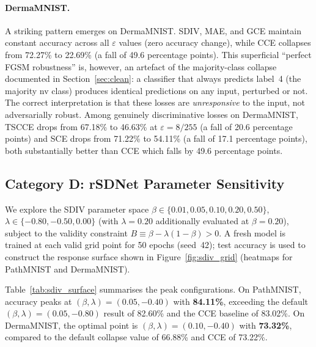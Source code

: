 \paragraph{DermaMNIST.}
A striking pattern emerges on DermaMNIST.
SDIV, MAE, and GCE maintain constant accuracy across all $\varepsilon$ values
(zero accuracy change), while CCE collapses from 72.27\% to 22.69\%
(a fall of 49.6 percentage points).
This superficial ``perfect FGSM robustness'' is, however, an artefact of the
majority-class collapse documented in Section~\ref{sec:clean}:
a classifier that always predicts label~4 (the majority nv class) produces
identical predictions on any input, perturbed or not.
The correct interpretation is that these losses are \emph{unresponsive} to
the input, not adversarially robust.
Among genuinely discriminative losses on DermaMNIST, TSCCE drops from
67.18\% to 46.63\% at $\varepsilon{=}8/255$ (a fall of 20.6 percentage points) and
SCE drops from 71.22\% to 54.11\% (a fall of 17.1 percentage points),
both substantially better than CCE which falls by 49.6 percentage points.

\subsection{Category D: rSDNet Parameter Sensitivity}
\label{sec:surface}

We explore the SDIV parameter space
$\beta \in \{0.01, 0.05, 0.10, 0.20, 0.50\}$,
$\lambda \in \{-0.80, -0.50, 0.00\}$ (with $\lambda{=}0.20$ additionally
evaluated at $\beta{=}0.20$),
subject to the validity constraint $B \equiv \beta - \lambda(1{-}\beta) > 0$.
A fresh model is trained at each valid grid point for 50 epochs (seed~42);
test accuracy is used to construct the response surface shown in
Figure~\ref{fig:sdiv_grid} (heatmaps for PathMNIST and DermaMNIST).

Table~\ref{tab:sdiv_surface} summarises the peak configurations.
On PathMNIST, accuracy peaks at
$(\beta, \lambda) = (0.05, -0.40)$ with \textbf{84.11\%},
exceeding the default $(\beta, \lambda) = (0.05, -0.80)$ result of 82.60\%
and the CCE baseline of 83.02\%.
On DermaMNIST, the optimal point is
$(\beta, \lambda) = (0.10, -0.40)$ with \textbf{73.32\%},
compared to the default collapse value of 66.88\% and CCE of 73.22\%.

